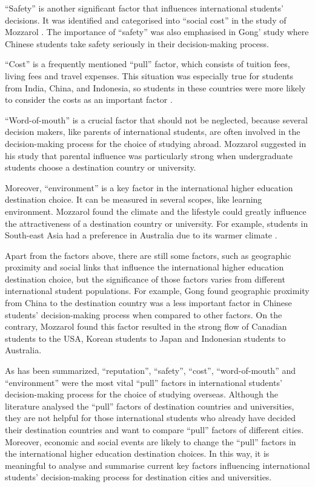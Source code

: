 “Safety” is another significant factor that influences international students’ decisions. It was identified and categorised into “social cost” in the study of Mozzarol \cite{mazzarol2002push}. The importance of “safety” was also emphasised in Gong’ study \cite{gong2015chinese} where Chinese students take safety seriously in their decision-making process. 

“Cost” is a frequently mentioned “pull” factor, which consists of tuition fees, living fees and travel expenses. This situation was especially true for students from India, China, and Indonesia, so students in these countries were more likely to consider the costs as an important factor \cite{gong2015chinese}.

“Word-of-mouth” is a crucial factor that should not be neglected, because several decision makers, like parents of international students, are often involved in the decision-making process for the choice of studying abroad. Mozzarol \cite{mazzarol2002push} suggested in his study that parental influence was particularly strong when undergraduate students choose a destination country or university. 

Moreover, “environment” is a key factor in the international higher education destination choice. It can be measured in several scopes, like learning environment. Mozzarol \cite{mazzarol2002push} found the climate and the lifestyle could greatly influence the attractiveness of a destination country or university. For example, students in South-east Asia had a preference in Australia due to its warmer climate \cite{mazzarol2002push}.

Apart from the factors above, there are still some factors, such as geographic proximity and social links that influence the international higher education destination choice, but the significance of those factors varies from different international student populations. For example, Gong \cite{gong2015chinese} found geographic proximity from China to the destination country was a less important factor in Chinese students’ decision-making process when compared to other factors. On the contrary, Mozzarol \cite{mazzarol2002push} found this factor resulted in the strong flow of Canadian students to the USA, Korean students to Japan and Indonesian students to Australia.

As has been summarized, “reputation”, “safety”, “cost”, “word-of-mouth” and “environment” were the most vital “pull” factors in international students’ decision-making process for the choice of studying overseas. Although the literature \cite{mazzarol2002push, maringe2007international,petruzzellis2010educational, gong2015chinese}  analysed the “pull” factors of destination countries and universities, they are not helpful for those international students who already have decided their destination countries and want to compare “pull” factors of different cities. Moreover, economic and social events are likely to change the “pull” factors in the international higher education destination choices. In this way, it is meaningful to analyse and summarise current key factors influencing international students’ decision-making process for destination cities and universities.


